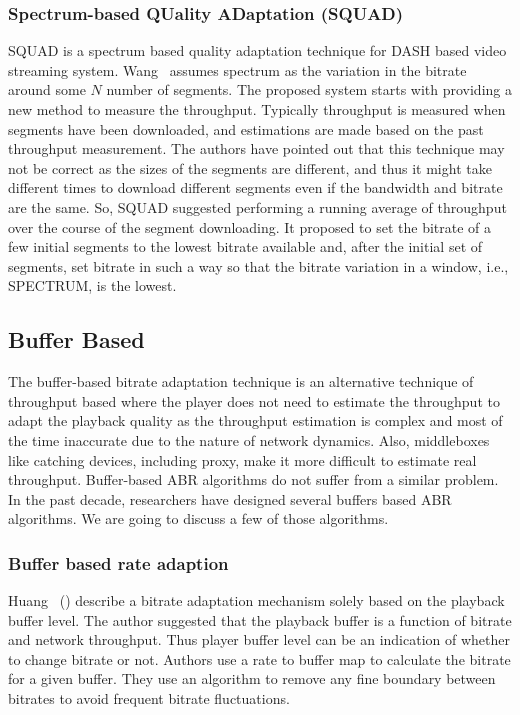 \subsubsection{Spectrum-based QUality ADaptation (SQUAD)}
SQUAD\cite{10.1145/2910017.2910593} is a spectrum\cite{1386243} based quality adaptation technique for DASH based video streaming system. Wang \etal\ assumes spectrum as the variation in the bitrate around some $N$ number of segments. The proposed system starts with providing a new method to measure the throughput. Typically throughput is measured when segments have been downloaded, and estimations are made based on the past throughput measurement. The authors have pointed out that this technique may not be correct as the sizes of the segments are different, and thus it might take different times to download different segments even if the bandwidth and bitrate are the same. So, SQUAD suggested performing a running average of throughput over the course of the segment downloading. It proposed to set the bitrate of a few initial segments to the lowest bitrate available and, after the initial set of segments, set bitrate in such a way so that the bitrate variation in a window, i.e., SPECTRUM, is the lowest.


\subsection{Buffer Based}
The buffer-based bitrate adaptation technique is an alternative technique of throughput based where the player does not need to estimate the throughput to adapt the playback quality as the throughput estimation is complex and most of the time inaccurate due to the nature of network dynamics. Also, middleboxes like catching devices, including proxy, make it more difficult to estimate real throughput. Buffer-based ABR algorithms do not suffer from a similar problem. In the past decade, researchers have designed several buffers based ABR algorithms. We are going to discuss a few of those algorithms.

\subsubsection{Buffer based rate adaption}
Huang \etal\ (\cite{Huang2014,10.1145/2398776.2398800,10.1145/2491172.2491179}) describe a bitrate adaptation mechanism solely based on the playback buffer level. The author suggested that the playback buffer is a function of bitrate and network throughput. Thus player buffer level can be an indication of whether to change bitrate or not. Authors use a rate to buffer map to calculate the bitrate for a given buffer. They use an algorithm to remove any fine boundary between bitrates to avoid frequent bitrate fluctuations.

